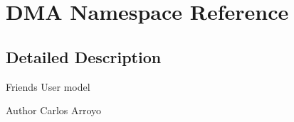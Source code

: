 \hypertarget{namespaceDMA}{\section{D\+M\+A Namespace Reference}
\label{namespaceDMA}
}


\subsection{Detailed Description}
Friends User model  \begin{DoxyAuthor}{Author}
Carlos Arroyo 
\end{DoxyAuthor}
